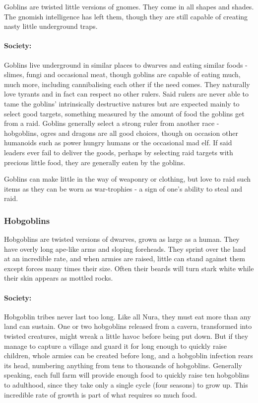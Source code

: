 \label{goblin}
\goblin

Goblins are twisted little versions of gnomes.  They come in all shapes and shades.  The gnomish intelligence has left them, though they are still capable of creating nasty little underground traps.

\paragraph{Society:} Goblins live underground in similar places to dwarves and eating similar foods - slimes, fungi and occasional meat, though goblins are capable of eating much, much more, including cannibalising each other if the need comes.  They naturally love tyrants and in fact can respect no other rulers.  Said rulers are never able to tame the goblins' intrinsically destructive natures but are expected mainly to select good targets, something measured by the amount of food the goblins get from a raid.  Goblins generally select a strong ruler from another race - hobgoblins, ogres and dragons are all good choices, though on occasion other humanoids such as power hungry humans or the occasional mad elf.  If said leaders ever fail to deliver the goods, perhaps by selecting raid targets with precious little food, they are generally eaten by the goblins.

	Goblins can make little in the way of weaponry or clothing, but love to raid such items as they can be worn as war-trophies - a sign of one's ability to steal and raid.

\subsubsection{Hobgoblins}\label{hobgoblin}
\hobgoblin

Hobgoblins are twisted versions of dwarves, grown as large as a human.  They have overly long ape-like arms and sloping foreheads.  They sprint over the land at an incredible rate, and when armies are raised, little can stand against them except forces many times their size.  Often their beards will turn stark white while their skin appears as mottled rocks.

\paragraph{Society:} Hobgoblin tribes never last too long.  Like all Nura, they must eat more than any land can sustain.  One or two hobgoblins released from a cavern, transformed into twisted creatures, might wreak a little havoc before being put down.  But if they manage to capture a village and guard it for long enough to quickly raise children, whole armies can be created before long, and a hobgoblin infection rears its head, numbering anything from tens to thousands of hobgoblins.  Generally speaking, each full farm will provide enough food to quickly raise ten hobgoblins to adulthood, since they take only a single cycle (four seasons) to grow up.  This incredible rate of growth is part of what requires so much food.
  
